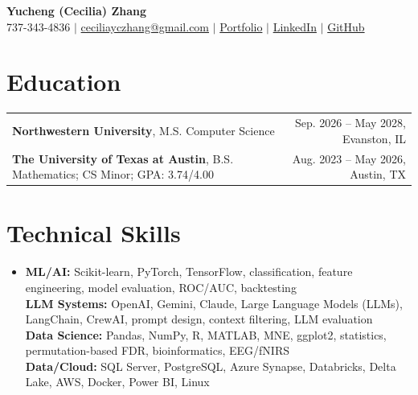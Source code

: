 \documentclass[letterpaper,10pt]{article}
\begin{document}
\begin{center}
{\Large\textbf{Yucheng (Cecilia) Zhang}}\\[-1pt]
\small 737-343-4836 $|$ \href{mailto:ceciliayczhang@gmail.com}{ceciliayczhang@gmail.com} $|$
\href{https://yczhangcc.github.io/yuchengzhang_portfolio/}{Portfolio} $|$
\href{https://www.linkedin.com/in/yczcecilia/}{LinkedIn} $|$
\href{https://github.com/yczhangcc}{GitHub}
\end{center}
\vspace{-8pt}

\section{Education}
{\small
\begin{tabular*}{0.985\textwidth}[t]{l@{\extracolsep{\fill}}r}
\textbf{Northwestern University}, M.S. Computer Science & Sep. 2026 -- May 2028, Evanston, IL \\
\textbf{The University of Texas at Austin}, B.S. Mathematics; CS Minor; GPA: 3.74/4.00 & Aug. 2023 -- May 2026, Austin, TX \\
\end{tabular*}}
\vspace{-5pt}

\section{Technical Skills}
\begin{itemize}[leftmargin=0.11in,label={},topsep=1pt,itemsep=0pt]
\footnotesize\item{
\textbf{ML/AI:} Scikit-learn, PyTorch, TensorFlow, classification, feature engineering, model evaluation, ROC/AUC, backtesting \\
\textbf{LLM Systems:} OpenAI, Gemini, Claude, Large Language Models (LLMs), LangChain, CrewAI, prompt design, context filtering, LLM evaluation \\
\textbf{Data Science:} Pandas, NumPy, R, MATLAB, MNE, ggplot2, statistics, permutation-based FDR, bioinformatics, EEG/fNIRS \\
\textbf{Data/Cloud:} SQL Server, PostgreSQL, Azure Synapse, Databricks, Delta Lake, AWS, Docker, Power BI, Linux
}
\end{itemize}
\vspace{-7pt}
\end{document}

